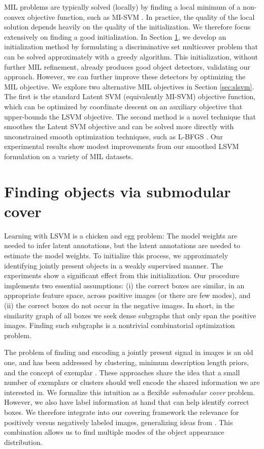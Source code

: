 \documentclass{article}
\begin{document}
MIL problems are typically solved (locally) by finding a local minimum of a non-convex objective function, such as MI-SVM \cite{misvm-nips}.
In practice, the quality of the local solution depends heavily on the quality of the initialization.
We therefore focus extensively on finding a good initialization.
In Section \ref{sec:covering}, we develop an initialization method by formulating a discriminative set multicover problem that can be solved approximately with a greedy algorithm.
This initialization, without further MIL refinement, already produces good object detectors, validating our approach.
However, we can further improve these detectors by optimizing the MIL objective.
We explore two alternative MIL objectives in Section \ref{sec:slsvm}.
The first is the standard Latent SVM (equivalently MI-SVM) objective function, which can be optimized by coordinate descent on an auxiliary objective that upper-bounds the LSVM objective.
The second method is a novel technique that smoothes the Latent SVM objective and can be solved more directly with unconstrained smooth optimization techniques, such as L-BFGS \cite{lbfgs}.
Our experimental results show modest improvements from our smoothed LSVM formulation on a variety of MIL datasets.

\section{Finding objects via submodular cover}
\label{sec:covering}

Learning with LSVM is a chicken and egg problem:
The model weights are needed to infer latent annotations, but the latent annotations are needed to estimate the model weights.
To initialize this process, we approximately identifying jointly present objects in a weakly supervised manner. The experiments show a significant effect from this initialization.
Our procedure implements two essential assumptions: (i) the correct boxes are similar, in an appropriate feature space, across positive images (or there are few modes), and (ii) the correct boxes do not occur in the negative images. In short, in the similarity graph of all boxes we seek dense subgraphs that only span the positive images. Finding such subgraphs is a nontrivial combinatorial optimization problem.

The problem of finding and encoding a jointly present signal in images is an old one, and has been addressed by clustering, minimum description length priors, and the concept of exemplar \cite{darrell90,leibe04,schiele06,kim11}.
These approaches share the idea that a small number of exemplars or clusters should well encode the shared information we are interested in. We formalize this intuition as a flexible \emph{submodular cover} problem. However, we also have label information at hand that can help identify correct boxes. We therefore integrate into our covering framework the relevance for positively versus negatively labeled images, generalizing ideas from \cite{discovery1}. This combination allows us to find multiple modes of the object appearance distribution.
\end{document}
